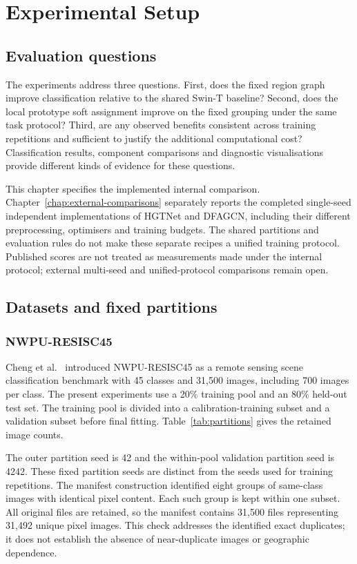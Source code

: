 \chapter{Experimental Setup}
\label{chap:setup}

\section{Evaluation questions}

The experiments address three questions. First, does the fixed region graph
improve classification relative to the shared Swin-T baseline? Second, does
the local prototype soft assignment improve on the fixed grouping under the
same task protocol? Third, are any observed benefits consistent across
training repetitions and sufficient to justify the additional computational
cost? Classification results, component comparisons and diagnostic
visualisations provide different kinds of evidence for these questions.

This chapter specifies the implemented internal comparison.
Chapter~\ref{chap:external-comparisons} separately reports the completed
single-seed independent implementations of HGTNet and DFAGCN, including
their different preprocessing, optimisers and training budgets. The shared
partitions and evaluation rules do not make these separate recipes a unified
training protocol. Published scores are not treated as measurements made
under the internal protocol; external multi-seed and unified-protocol
comparisons remain open.

\section{Datasets and fixed partitions}

\subsection{NWPU-RESISC45}

Cheng et al.~\cite{cheng2017nwpu} introduced NWPU-RESISC45 as a remote
sensing scene classification benchmark with 45 classes and 31,500 images,
including 700 images per class. The present experiments use a 20\% training
pool and an 80\% held-out test set. The training pool is divided into a
calibration-training subset and a validation subset before final fitting.
Table~\ref{tab:partitions} gives the retained image counts.

The outer partition seed is 42 and the within-pool validation partition seed
is 4242. These fixed partition seeds are distinct from the seeds used for
training repetitions. The manifest construction identified eight groups of
same-class images with identical pixel content. Each such group is kept
within one subset. All original files are retained, so the manifest contains
31,500 files representing 31,492 unique pixel images. This check addresses
the identified exact duplicates; it does not establish the absence of
near-duplicate images or geographic dependence.

